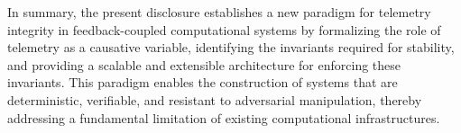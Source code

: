 In summary, the present disclosure establishes a new paradigm for telemetry integrity in feedback-coupled computational systems by formalizing the role of telemetry as a causative variable, identifying the invariants required for stability, and providing a scalable and extensible architecture for enforcing these invariants. This paradigm enables the construction of systems that are deterministic, verifiable, and resistant to adversarial manipulation, thereby addressing a fundamental limitation of existing computational infrastructures.